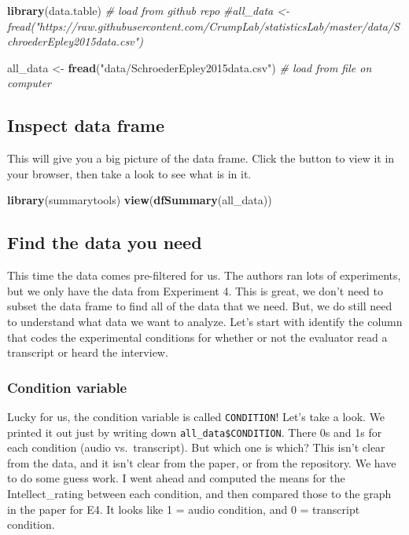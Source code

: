 \documentclass[]{book}
\newenvironment{Shaded}{\begin{snugshade}}{\end{snugshade}}
\newcommand{\KeywordTok}[1]{\textcolor[rgb]{0.13,0.29,0.53}{\textbf{#1}}}
\newcommand{\StringTok}[1]{\textcolor[rgb]{0.31,0.60,0.02}{#1}}
\newcommand{\CommentTok}[1]{\textcolor[rgb]{0.56,0.35,0.01}{\textit{#1}}}
\newcommand{\NormalTok}[1]{#1}
\begin{document}
\begin{Shaded}
\begin{Highlighting}[]
\KeywordTok{library}\NormalTok{(data.table)}
\CommentTok{# load from github repo}
\CommentTok{#all_data <- fread("https://raw.githubusercontent.com/CrumpLab/statisticsLab/master/data/SchroederEpley2015data.csv")}

\NormalTok{all_data <-}\StringTok{ }\KeywordTok{fread}\NormalTok{(}\StringTok{"data/SchroederEpley2015data.csv"}\NormalTok{) }\CommentTok{# load from file on computer}
\end{Highlighting}
\end{Shaded}

\subsection{Inspect data frame}\label{inspect-data-frame}

This will give you a big picture of the data frame. Click the button to
view it in your browser, then take a look to see what is in it.

\begin{Shaded}
\begin{Highlighting}[]
\KeywordTok{library}\NormalTok{(summarytools)}
\KeywordTok{view}\NormalTok{(}\KeywordTok{dfSummary}\NormalTok{(all_data))}
\end{Highlighting}
\end{Shaded}

\subsection{Find the data you need}\label{find-the-data-you-need}

This time the data comes pre-filtered for us. The authors ran lots of
experiments, but we only have the data from Experiment 4. This is great,
we don't need to subset the data frame to find all of the data that we
need. But, we do still need to understand what data we want to analyze.
Let's start with identify the column that codes the experimental
conditions for whether or not the evaluator read a transcript or heard
the interview.

\subsubsection{Condition variable}\label{condition-variable}

Lucky for us, the condition variable is called \texttt{CONDITION}! Let's
take a look. We printed it out just by writing down
\texttt{all\_data\$CONDITION}. There 0s and 1s for each condition (audio
vs.~transcript). But which one is which? This isn't clear from the data,
and it isn't clear from the paper, or from the repository. We have to do
some guess work. I went ahead and computed the means for the
Intellect\_rating between each condition, and then compared those to the
graph in the paper for E4. It looks like 1 = audio condition, and 0 =
transcript condition.
\end{document}
